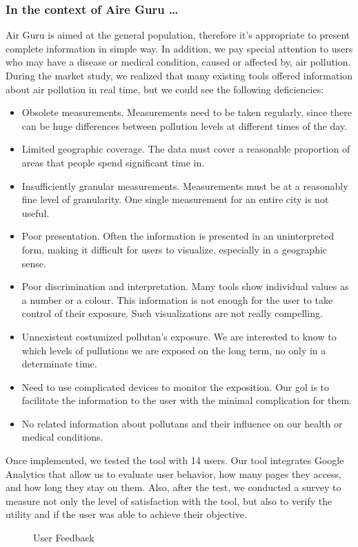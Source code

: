 \subsubsection*{In the context of Aire Guru \ldots} 
Air Guru is aimed at the general population, therefore it's appropriate to present complete information in simple way. In addition, we pay special attention to users who may have a
disease or medical condition, caused or affected by, air pollution.
During the market study, we realized that many existing tools offered information about air pollution in real time, but we could see the following deficiencies:
\begin{itemize}
    \item Obsolete measurements. Measurements need to be taken regularly, since there can be huge differences
    between pollution levels at different times of the day.
    \item Limited geographic coverage. The data must cover a reasonable proportion of areas that people spend significant time in.
    \item Insufficiently granular measurements. Measurements must be at a reasonably fine level of granularity. One single measurement for an entire city is not useful.
    \item Poor presentation. Often the information is presented in an uninterpreted form, making it difficult for users to visualize, especially in a geographic sense.
    \item Poor discrimination and interpretation. Many tools show individual values as a number or a colour. This information is not
    enough for the user to take control of their exposure. Such visualizations are not really compelling. 
    \item Unnexistent costumized pollutan's exposure. We are interested to know to which levels of pullutions we are exposed on the long term, no only in a determinate time.
    \item Need to use complicated devices to monitor the exposition. Our gol is to facilitate the information to the user with the minimal complication for them.
    \item No related information about pollutans and their influence on our health or medical conditions.
\end{itemize}

Once implemented, we tested the tool with 14 users. Our tool integrates Google Analytics that allow us to evaluate
user behavior, how many pages they access, and how long they stay on them. Also, after the test, we conducted a survey to measure not only the level of satisfaction with the tool, but also to verify the utility and if the user was able to achieve their objective.
\begin{figure}[ht]
    \centering
    \hfill
  
  \caption{User Feedback}
    \end{figure}
 
